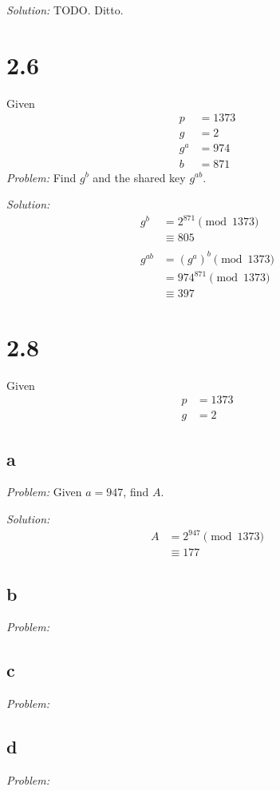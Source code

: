 \documentclass[12pt]{article}
\begin{document}
\textit{Solution:} TODO. Ditto.

\section*{2.6}
Given
\begin{align*}
    p &= 1373 \\
    g &= 2 \\
    g^a &= 974 \\
    b &= 871
\end{align*}
\textit{Problem:} Find $g^b$ and the shared key $g^{ab}$.

\textit{Solution:}
\begin{align*}
    g^b &= 2^{871} \pmod{1373} \\
    &\equiv \boxed{805} \\
    \\
    g^{ab} &= (g^a)^b \pmod{1373} \\
    &= 974^{871} \pmod{1373} \\
    &\equiv \boxed{397}
\end{align*}

\section*{2.8}
Given
\begin{align*}
    p &= 1373 \\
    g &= 2
\end{align*}

\subsection*{a}
\textit{Problem:} Given $a = 947$, find $A$.

\textit{Solution:}
\begin{align*}
    A &= 2^{947} \pmod{1373} \\
    &\equiv \boxed{177}
\end{align*}

\subsection*{b}
\textit{Problem:}

\subsection*{c}
\textit{Problem:}

\subsection*{d}
\textit{Problem:}
\end{document}

